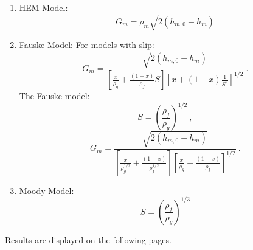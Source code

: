 \documentclass[11pt]{article}
\begin{document}
\begin{enumerate}
    \item HEM Model:
    \begin{equation}
        G_m = \rho_m \sqrt{2 \left( h_{m,0} - h_m \right)}
    \end{equation}
    
    
    
    \item Fauske Model:
    For models with slip:
    \begin{equation}
        G_m = \frac{\sqrt{2 \left( h_{m,0} - h_m \right)}}{\left[ \frac{x}{\rho_g} + \frac{\left( 1-x \right)}{\rho_f} S \right] \left[ x + \left( 1-x \right)\frac{1}{S^2} \right]^{1/2}}\:.
    \end{equation}
    The Fauske model:
    \begin{equation}
        S = \left( \frac{\rho_f}{\rho_g} \right)^{1/2}\:,
    \end{equation}
    \begin{equation}
        G_m = \frac{\sqrt{2 \left( h_{m,0} - h_m \right)}}{\left[ \frac{x}{\rho_g^{1/2}} + \frac{\left( 1-x \right)}{\rho_f^{1/2}} \right] \left[ \frac{x}{\rho_g} + \frac{\left( 1-x \right)}{\rho_f} \right]^{1/2}}\:.
    \end{equation}
    
    
    
    \item Moody Model:
    \begin{equation}
        S = \left( \frac{\rho_f}{\rho_g} \right)^{1/3}
    \end{equation}
    



\end{enumerate}
Results are displayed on the following pages.
\end{document}
